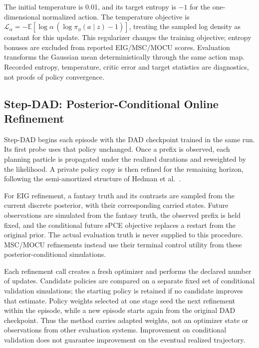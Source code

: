 \documentclass[journal]{IEEEtran}
\newcommand{\E}{\mathbb E}
\begin{document}
The initial temperature is 0.01, and its target entropy is $-1$ for the
one-dimensional normalized action. The temperature objective is
$\mathcal L_\alpha=-\E[\log\alpha\,
(\log\pi_\phi(a\mid z)-1)]$, treating the sampled log density as constant
for this update. This regularizer changes the training objective; entropy
bonuses are excluded from reported EIG/MSC/MOCU scores. Evaluation transforms
the Gaussian mean deterministically through the same action map. Recorded
entropy, temperature, critic error and target statistics are diagnostics,
not proofs of policy convergence.

\subsection{Step-DAD: Posterior-Conditional Online Refinement}
Step-DAD begins each episode with the DAD checkpoint trained in the same run.
Its first probe uses that policy unchanged. Once a prefix is observed, each
planning particle is propagated under the realized durations and reweighted
by the likelihood. A private policy copy is then refined for the remaining
horizon, following the semi-amortized structure of
Hedman et al.~\cite{hedman2025stepdad}.

For EIG refinement, a fantasy truth and its contrasts are sampled from the
current discrete posterior, with their corresponding carried states. Future
observations are simulated from the fantasy truth, the observed prefix is held
fixed, and the conditional future sPCE objective replaces a restart from the
original prior. The actual evaluation truth is never supplied to this procedure.
MSC/MOCU refinements instead use their terminal control utility from these
posterior-conditional simulations.

Each refinement call creates a fresh optimizer and performs the declared
number of updates. Candidate policies are compared on a separate fixed set of
conditional validation simulations; the starting policy is retained if no
candidate improves that estimate. Policy weights selected at one stage seed
the next refinement within the episode, while a new episode starts again from
the original DAD checkpoint. Thus the method carries adapted weights, not an
optimizer state or observations from other evaluation systems. Improvement
on conditional validation does not guarantee improvement on the eventual
realized trajectory.
\end{document}
